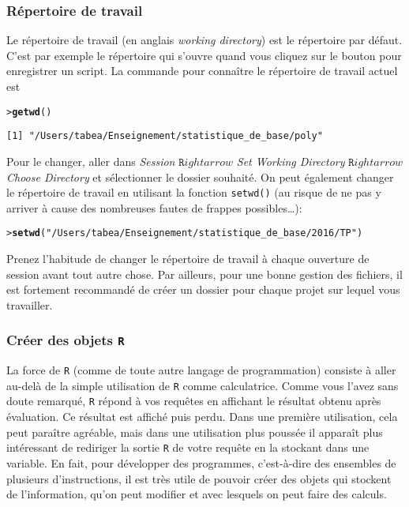 \documentclass[11pt]{article}
\makeatletter
\numberwithin{equation}{section}
\theoremstyle{remark}
\newenvironment{kframe}{%
 \def\at@end@of@kframe{}%
 \ifinner\ifhmode%
  \def\at@end@of@kframe{\end{minipage}}%
  \begin{minipage}{\columnwidth}%
 \fi\fi%
 \def\FrameCommand##1{\hskip\@totalleftmargin \hskip-\fboxsep
 \colorbox{shadecolor}{##1}\hskip-\fboxsep
     \hskip-\linewidth \hskip-\@totalleftmargin \hskip\columnwidth}%
 \MakeFramed {\advance\hsize-\width
   \@totalleftmargin\z@ \linewidth\hsize
   \@setminipage}}%
 {\par\unskip\endMakeFramed%
 \at@end@of@kframe}
\newenvironment{knitrout}{}{}
\newcommand{\hlstr}[1]{\textcolor[rgb]{0.43,0.21,0.1}{#1}}%
\newcommand{\hlstd}[1]{\textcolor[rgb]{0,0.2,0.4}{#1}}%
\newcommand{\hlkwd}[1]{\textcolor[rgb]{0.76,0.13,0.28}{\textbf{#1}}}%
\makeatother
\begin{document}
\subsubsection{Répertoire de travail}
 Le répertoire de travail (en anglais {\it working directory}) est le répertoire par défaut. C'est par exemple le  répertoire qui s'ouvre quand vous cliquez sur le bouton pour enregistrer un script.
 La commande pour connaître le répertoire de travail actuel est  
\begin{knitrout}
\color{fgcolor}\begin{kframe}
\begin{alltt}
\hlstd{> }\hlkwd{getwd}\hlstd{()}
\end{alltt}
\begin{verbatim}
[1] "/Users/tabea/Enseignement/statistique_de_base/poly"
\end{verbatim}
\end{kframe}
\end{knitrout}
Pour le changer, aller dans {\it Session} $\texttt{R}ightarrow$ {\it Set Working Directory} $\texttt{R}ightarrow$ {\it Choose Directory} et  sélectionner le dossier souhaité. On peut également changer le répertoire de travail en utilisant la fonction \texttt{setwd()} (au risque de ne pas y arriver à cause des nombreuses fautes de frappes possibles\dots):
\begin{knitrout}
\color{fgcolor}\begin{kframe}
\begin{alltt}
\hlstd{> }\hlkwd{setwd}\hlstd{(}\hlstr{"/Users/tabea/Enseignement/statistique_de_base/2016/TP"}\hlstd{)}
\end{alltt}
\end{kframe}
\end{knitrout}
Prenez l'habitude  de  changer le répertoire de travail à chaque ouverture de session avant tout autre chose. Par ailleurs, pour une bonne gestion des fichiers, il est fortement recommandé de créer un dossier pour chaque projet sur lequel vous travailler.  

\subsubsection{Créer des objets \texttt{R}}
La force de \texttt{R} (comme de toute autre langage de programmation) consiste à aller au-delà de la simple utilisation de \texttt{R} comme calculatrice.
Comme vous l'avez sans doute remarqué, \texttt R répond à vos requêtes en affichant le résultat obtenu après évaluation. Ce résultat est affiché puis perdu. Dans une première utilisation, cela peut paraître agréable, 
mais dans une utilisation plus poussée 
il apparaît plus intéressant de rediriger la sortie
\texttt R de votre requête en la stockant dans une variable. 
En fait, pour  développer des programmes, c'est-à-dire  des ensembles de plusieurs  d'instructions,  il est très utile de pouvoir créer des objets  qui stockent de l'information, qu'on peut modifier et avec lesquels on peut faire des calculs.
\end{document}
